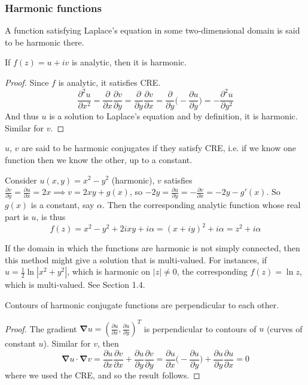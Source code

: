 \documentclass[a4paper]{article}
\begin{document}
\subsubsection{Harmonic functions}
\begin{defi}
A function satisfying Laplace's equation in some two-dimensional domain is said to be harmonic there.
\end{defi}
\begin{prop}
If $f(z)=u+iv$ is analytic, then it is harmonic.
\end{prop}
\begin{proof} Since $f$ is analytic, it satisfies CRE.
$$\frac{\partial^2u}{\partial x^2}=\frac{\partial }{\partial x}\frac{\partial v}{\partial y}=\frac{\partial}{\partial y}\frac{\partial v}{\partial x}=\frac{\partial}{\partial y}\bigg(-\frac{\partial u}{\partial y}\bigg)=-\frac{\partial^2u}{\partial y^2}$$
And thus $u$ is a solution to Laplace's equation and by definition, it is harmonic. Similar for $v$.
\end{proof}
\begin{defi}
$u$, $v$ are said to be harmonic conjugates if they satisfy CRE, i.e. if we know one function then we know the other, up to a constant.
\end{defi}
\begin{eg}
Consider $u(x,y)=x^2-y^2$ (harmonic), $v$ satisfies $\frac{\partial v}{\partial y}=\frac{\partial u}{\partial x}=2x\implies v=2xy+g(x)$, so $-2y=\frac{\partial u}{\partial y}=-\frac{\partial v}{\partial x}=-2y-g'(x)$. So $g(x)$ is a constant, say $\alpha$. Then the corresponding analytic function whose real part is $u$, is thus
$$f(z)=x^2-y^2+2ixy+i\alpha=(x+iy)^2+i\alpha=z^2+i\alpha$$
\end{eg}
\begin{remarks}
If the domain in which the functions are harmonic is not simply connected, then this method might give a solution that is multi-valued. For instances, if $u=\frac{1}{2}\ln|x^2+y^2|$, which is harmonic on $|z|\neq 0$, the corresponding $f(z)=\ln z$, which is multi-valued. See Section 1.4.
\end{remarks}
\begin{prop}
Contours of harmonic conjugate functions are perpendicular to each other.
\end{prop}
\begin{proof}
The gradient $\boldsymbol{\nabla}u=(\frac{\partial u}{\partial x},\frac{\partial u}{\partial y})^T$ is perpendicular to contours of $u$ (curves of constant $u$). Similar for $v$, then
$$\boldsymbol{\nabla}u\cdot\boldsymbol{\nabla}v=\frac{\partial u}{\partial x}\frac{\partial v}{\partial x}+\frac{\partial u}{\partial y}\frac{\partial v}{\partial y}=\frac{\partial u}{\partial x}\bigg(-\frac{\partial u}{\partial y}\bigg)+\frac{\partial u}{\partial y}\frac{\partial u}{\partial x}=0$$
where we used the CRE, and so the result follows.
\end{proof}
\end{document}
